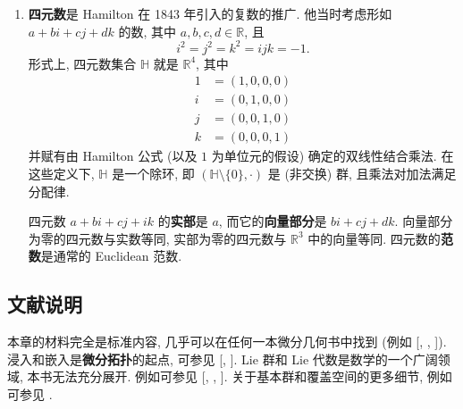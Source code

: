 \begin{enumerate}[label=(\arabic*),leftmargin=*]
若 $M$ 连通且它是 $\pi_1(M,p)$ 中唯一的类, 则称 $M$ 是\textbf{单连通的}. 这意味着通过 $p$ 的每条环路都能连续变形为常值环路. 这一性质与点 $p$ 的选取无关, 并且等价于 $M$ 中任何闭路径都能连续变形为常值环路.
\item \textbf{四元数}是 Hamilton 在 1843 年引入的复数的推广. 他当时考虑形如 $a+bi+cj+dk$ 的数, 其中 $a,b,c,d\in\mathbb{R}$, 且
\[
  i^2=j^2=k^2=ijk=-1.
\]
形式上, 四元数集合 $\mathbb{H}$ 就是 $\mathbb{R}^4$, 其中
\begin{align*}
  1&=(1,0,0,0)\\ i&=(0,1,0,0)\\
  j&=(0,0,1,0)\\ k&=(0,0,0,1)
\end{align*}
并赋有由 Hamilton 公式 (以及 $1$ 为单位元的假设) 确定的双线性结合乘法. 在这些定义下, $\mathbb{H}$ 是一个除环, 即 $(\mathbb{H}\setminus\{0\},\cdot)$ 是 (非交换) 群, 且乘法对加法满足分配律.

四元数 $a+bi+cj+ik$ 的\textbf{实部}是 $a$, 而它的\textbf{向量部分}是 $bi+cj+dk$. 向量部分为零的四元数与实数等同, 实部为零的四元数与 $\mathbb{R}^3$ 中的向量等同. 四元数的\textbf{范数}是通常的 Euclidean 范数.
\end{enumerate}

\subsection{文献说明}\label{subsec:bibliographical-notes-differentiable-manifolds}

本章的材料完全是标准内容, 几乎可以在任何一本微分几何书中找到 (例如 [, , ]). 浸入和嵌入是\textbf{微分拓扑}的起点, 可参见 [, ]. Lie 群和 Lie 代数是数学的一个广阔领域, 本书无法充分展开. 例如可参见 [, , ]. 关于基本群和覆盖空间的更多细节, 例如可参见 .
